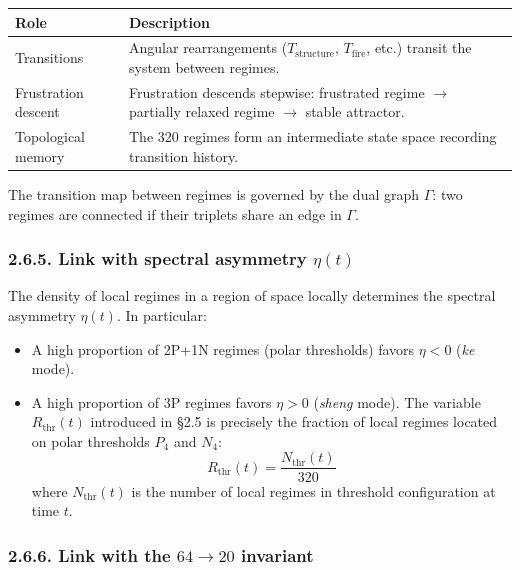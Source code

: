 \documentclass[11pt]{article}
\providecommand{\tightlist}{\setlength{\itemsep}{2pt}\setlength{\parskip}{6pt}}
\providecommand{\tightlist}{%
  \setlength{\itemsep}{2pt}\setlength{\parskip}{6pt}
}
\begin{document}
\begin{table}[H]
\centering
\small
\begin{tabularx}{\textwidth}{@{}lX@{}}
\toprule
Role & Description \\
\midrule
Transitions & Angular rearrangements ($T_{\text{structure}}$, $T_{\text{fire}}$, etc.) transit the system between regimes. \\
Frustration descent & Frustration descends stepwise: frustrated regime $\to$ partially relaxed regime $\to$ stable attractor. \\
Topological memory & The 320 regimes form an intermediate state space recording transition history. \\
\bottomrule
\end{tabularx}
\end{table}

The transition map between regimes is governed by the dual graph
\(\Gamma\): two regimes are connected if their triplets share an edge in
\(\Gamma\).

\hypertarget{link-with-spectral-asymmetry-etat}{%
\subsubsection{\texorpdfstring{2.6.5. Link with spectral asymmetry
\(\eta(t)\)}{2.6.5. Link with spectral asymmetry \textbackslash eta(t)}}\label{link-with-spectral-asymmetry-etat}}

The density of local regimes in a region of space locally determines the
spectral asymmetry \(\eta(t)\). In particular:

\begin{itemize}
\tightlist
\item
  A high proportion of 2P+1N regimes (polar thresholds) favors
  \(\eta < 0\) (\textit{ke} mode).
\item
  A high proportion of 3P regimes favors \(\eta > 0\) (\textit{sheng}
  mode). The variable \(R_{\text{thr}}(t)\) introduced in §2.5 is
  precisely the fraction of local regimes located on polar thresholds
  \(P_4\) and \(N_4\): \[
  R_{\text{thr}}(t) = \frac{N_{\text{thr}}(t)}{320}
  \] where \(N_{\text{thr}}(t)\) is the number of local regimes in
  threshold configuration at time \(t\).
\end{itemize}

\hypertarget{link-with-the-64-to-20-invariant}{%
\subsubsection{\texorpdfstring{2.6.6. Link with the \(64 \to 20\)
invariant}{2.6.6. Link with the 64 \textbackslash to 20 invariant}}\label{link-with-the-64-to-20-invariant}}
\end{document}
